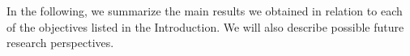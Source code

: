 In the following, we summarize the main results we obtained in relation to each of the objectives listed in the Introduction. We will also describe possible future research perspectives.



